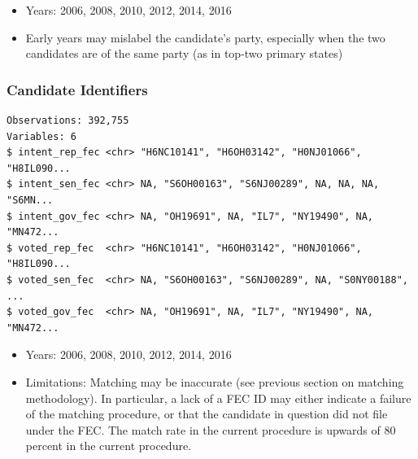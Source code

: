 \documentclass[10pt,article,oneside]{memoir}
\theoremstyle{definition}
\begin{document}
\begin{itemize}
\tightlist
\item
  Years: 2006, 2008, 2010, 2012, 2014, 2016
\item
  Early years may mislabel the candidate's party, especially when the
  two candidates are of the same party (as in top-two primary states)
\end{itemize}

\subsubsection{Candidate Identifiers}\label{candidate-identifiers}

\begin{verbatim}
Observations: 392,755
Variables: 6
$ intent_rep_fec <chr> "H6NC10141", "H6OH03142", "H0NJ01066", "H8IL090...
$ intent_sen_fec <chr> NA, "S6OH00163", "S6NJ00289", NA, NA, NA, "S6MN...
$ intent_gov_fec <chr> NA, "OH19691", NA, "IL7", "NY19490", NA, "MN472...
$ voted_rep_fec  <chr> "H6NC10141", "H6OH03142", "H0NJ01066", "H8IL090...
$ voted_sen_fec  <chr> NA, "S6OH00163", "S6NJ00289", NA, "S0NY00188", ...
$ voted_gov_fec  <chr> NA, "OH19691", NA, "IL7", "NY19490", NA, "MN472...
\end{verbatim}

\begin{itemize}
\tightlist
\item
  Years: 2006, 2008, 2010, 2012, 2014, 2016
\item
  Limitations: Matching may be inaccurate (see previous section on
  matching methodology). In particular, a lack of a FEC ID may either
  indicate a failure of the matching procedure, or that the candidate in
  question did not file under the FEC. The match rate in the current
  procedure is upwards of 80 percent in the current procedure.
\end{itemize}
\end{document}
